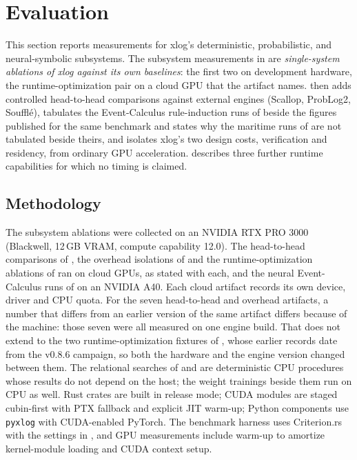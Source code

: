 \section{Evaluation}\label{sec:eval}

This section reports measurements for xlog's deterministic, probabilistic, and neural-symbolic subsystems. The subsystem measurements in  are \emph{single-system ablations of xlog against its own baselines}: the first two on development hardware, the runtime-optimization pair on a cloud GPU that the artifact names.  then adds controlled head-to-head comparisons against external engines (Scallop, ProbLog2, Soufflé),  tabulates the Event-Calculus rule-induction runs of  beside the figures published for the same benchmark and states why the maritime runs of  are not tabulated beside theirs, and  isolates xlog's two design costs, verification and residency, from ordinary GPU acceleration.  describes three further runtime capabilities for which no timing is claimed.

\subsection{Methodology}

The subsystem ablations were collected on an NVIDIA RTX PRO 3000 (Blackwell, 12\,GB VRAM, compute capability 12.0). The head-to-head comparisons of , the overhead isolations of  and the runtime-optimization ablations of  ran on cloud GPUs, as stated with each, and the neural Event-Calculus runs of  on an NVIDIA A40. Each cloud artifact records its own device, driver and CPU quota. For the seven head-to-head and overhead artifacts, a number that differs from an earlier version of the same artifact differs because of the machine: those seven were all measured on one engine build. That does not extend to the two runtime-optimization fixtures of , whose earlier records date from the v0.8.6 campaign, so both the hardware and the engine version changed between them. The relational searches of  and  are deterministic CPU procedures whose results do not depend on the host; the weight trainings beside them run on CPU as well. Rust crates are built in release mode; CUDA modules are staged cubin-first with PTX fallback and explicit JIT warm-up; Python components use \texttt{pyxlog} with CUDA-enabled PyTorch. The benchmark harness uses Criterion.rs with the settings in , and GPU measurements include warm-up to amortize kernel-module loading and CUDA context setup.

